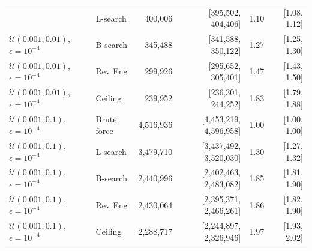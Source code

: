 \begin{table}[ht]
\begin{tabular}{llrrrr}
& L-search
& 400{,}006
& {[395{,}502, 404{,}406]}
& 1.10
& {[1.08, 1.12]} \\
$\mathcal{U}(0.001,0.01)$, $\epsilon=10^{-4}$
& B-search
& 345{,}488
& {[341{,}588, 350{,}122]}
& 1.27
& {[1.25, 1.30]} \\
$\mathcal{U}(0.001,0.01)$, $\epsilon=10^{-4}$
& Rev Eng
& 299{,}926
& {[295{,}652, 305{,}401]}
& 1.47
& {[1.43, 1.50]} \\
$\mathcal{U}(0.001,0.01)$, $\epsilon=10^{-4}$
& Ceiling
& 239{,}952
& {[236{,}301, 244{,}252]}
& 1.83
& {[1.79, 1.88]} \\
$\mathcal{U}(0.001,0.1)$, $\epsilon=10^{-4}$
& Brute force
& 4{,}516{,}936
& {[4{,}453{,}219, 4{,}596{,}958]}
& 1.00
& {[1.00, 1.00]} \\
$\mathcal{U}(0.001,0.1)$, $\epsilon=10^{-4}$
& L-search
& 3{,}479{,}710
& {[3{,}437{,}492, 3{,}520{,}030]}
& 1.30
& {[1.27, 1.32]} \\
$\mathcal{U}(0.001,0.1)$, $\epsilon=10^{-4}$
& B-search
& 2{,}440{,}996
& {[2{,}402{,}463, 2{,}483{,}082]}
& 1.85
& {[1.81, 1.90]} \\
$\mathcal{U}(0.001,0.1)$, $\epsilon=10^{-4}$
& Rev Eng
& 2{,}430{,}064
& {[2{,}395{,}371, 2{,}466{,}261]}
& 1.86
& {[1.82, 1.90]} \\
$\mathcal{U}(0.001,0.1)$, $\epsilon=10^{-4}$
& Ceiling
& 2{,}288{,}717
& {[2{,}244{,}897, 2{,}326{,}946]}
& 1.97
& {[1.93, 2.02]} \\
\bottomrule
\end{tabular}
\end{table}
